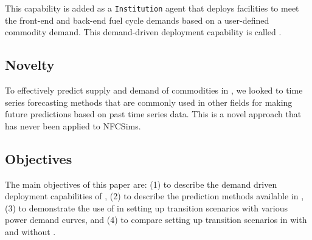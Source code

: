 This capability is added as a \Cyclus \texttt{Institution}
agent that deploys facilities to meet the front-end and back-end 
fuel cycle demands based on a user-defined commodity demand. 
This demand-driven deployment capability is called 
\deploy. 

\subsection{Novelty}
To effectively predict supply and demand of commodities in 
\deploy, we looked to time series forecasting methods that are 
commonly used in other fields for making future predictions 
based on past time series data. 
This is a novel approach that has never been applied to 
\gls{NFCSim}s. 

\subsection{Objectives}
\label{sec:obj}
The main objectives of this paper are: 
(1) to describe the demand driven deployment capabilities of 
\Cyclus, (2) to describe the prediction methods available in 
\deploy, (3) to demonstrate the use of \deploy in setting up 
transition scenarios with various power demand curves, and (4) 
to compare setting up transition scenarios in \Cyclus with and 
without \deploy. 